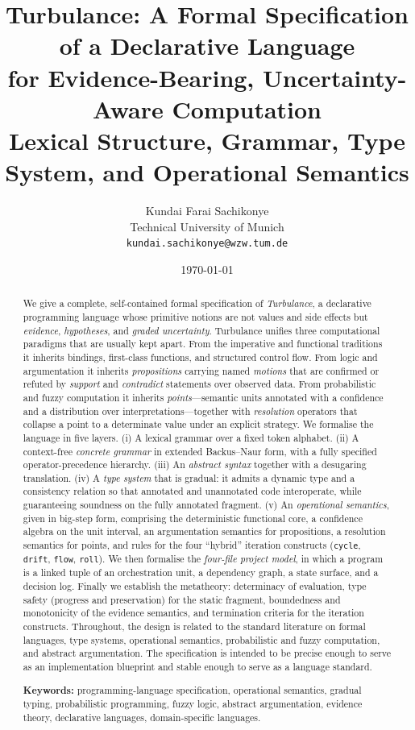\documentclass[11pt,a4paper]{article}
\title{\textbf{Turbulance: A Formal Specification of a Declarative Language\\
for Evidence-Bearing, Uncertainty-Aware Computation}\\[4pt]
\large Lexical Structure, Grammar, Type System, and Operational Semantics}
\author{Kundai Farai Sachikonye\\[2pt]
\small Technical University of Munich\\
\small \texttt{kundai.sachikonye@wzw.tum.de}}
\date{\today}
\theoremstyle{plain}
\theoremstyle{definition}
\theoremstyle{remark}
\begin{document}
\maketitle

\begin{abstract}
\noindent
We give a complete, self-contained formal specification of \emph{Turbulance},
a declarative programming language whose primitive notions are not values and
side effects but \emph{evidence}, \emph{hypotheses}, and \emph{graded
uncertainty}. Turbulance unifies three computational paradigms that are
usually kept apart. From the imperative and functional traditions it inherits
bindings, first-class functions, and structured control flow. From logic and
argumentation it inherits \emph{propositions} carrying named \emph{motions}
that are confirmed or refuted by \emph{support} and \emph{contradict}
statements over observed data. From probabilistic and fuzzy computation it
inherits \emph{points}---semantic units annotated with a confidence and a
distribution over interpretations---together with \emph{resolution} operators
that collapse a point to a determinate value under an explicit strategy. We
formalise the language in five layers. (i) A lexical grammar over a fixed
token alphabet. (ii) A context-free \emph{concrete grammar} in extended
Backus--Naur form, with a fully specified operator-precedence hierarchy. (iii)
An \emph{abstract syntax} together with a desugaring translation. (iv) A
\emph{type system} that is gradual: it admits a dynamic type and a consistency
relation so that annotated and unannotated code interoperate, while
guaranteeing soundness on the fully annotated fragment. (v) An \emph{operational
semantics}, given in big-step form, comprising the deterministic functional
core, a confidence algebra on the unit interval, an argumentation semantics for
propositions, a resolution semantics for points, and rules for the four
``hybrid'' iteration constructs (\texttt{cycle}, \texttt{drift}, \texttt{flow},
\texttt{roll}). We then formalise the \emph{four-file project model}, in which a
program is a linked tuple of an orchestration unit, a dependency graph, a state
surface, and a decision log. Finally we establish the metatheory: determinacy
of evaluation, type safety (progress and preservation) for the static fragment,
boundedness and monotonicity of the evidence semantics, and termination
criteria for the iteration constructs. Throughout, the design is related to the
standard literature on formal languages, type systems, operational semantics,
probabilistic and fuzzy computation, and abstract argumentation. The
specification is intended to be precise enough to serve as an implementation
blueprint and stable enough to serve as a language standard.

\medskip
\noindent\textbf{Keywords:} programming-language specification, operational
semantics, gradual typing, probabilistic programming, fuzzy logic, abstract
argumentation, evidence theory, declarative languages, domain-specific
languages.
\end{abstract}
\end{document}
